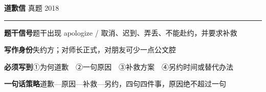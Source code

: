 \documentclass[11pt,a4paper]{ctexart}
\begin{document}
\clearpage
{}\label{g07}
\noindent{\color{accent}\rule{\linewidth}{1.5pt}}\par\vspace{3pt}
\hspace{6pt}
{\LARGE\bfseries 道歉信}\hfill
{\footnotesize\color{gray} 真题 2018}\par
\vspace{1pt}
{\color{accent!35}\rule{\linewidth}{0.5pt}}\par\vspace{3pt}
{\footnotesize {\color{accent}\bfseries 题干信号}\quad 题干出现 apologize / 取消、迟到、弄丢、不能赴约，并要求补救}\par
{\footnotesize {\color{accent}\bfseries 写作身份}\quad 失约方；对师长正式，对朋友可少一点公文腔}\par
{\footnotesize {\color{accent}\bfseries 必须写到}\quad ①为何道歉　②一句原因　③补救方案　④另约时间或替代办法}\par
{\footnotesize {\color{accent}\bfseries 一句话策略}\quad 道歉—原因—补救—另约，四句四件事，原因绝不超过一句}\par
\end{document}
